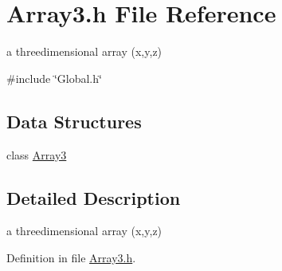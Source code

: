 \section{Array3.h File Reference}
\label{Array3_8h}


a threedimensional array (x,y,z)  


{\ttfamily \#include \char`\"{}Global.h\char`\"{}}\par
\subsection*{Data Structures}
\begin{DoxyCompactItemize}
\item 
class \hyperlink{classArray3}{Array3}
\end{DoxyCompactItemize}


\subsection{Detailed Description}
a threedimensional array (x,y,z) 

Definition in file \hyperlink{Array3_8h_source}{Array3.h}.

